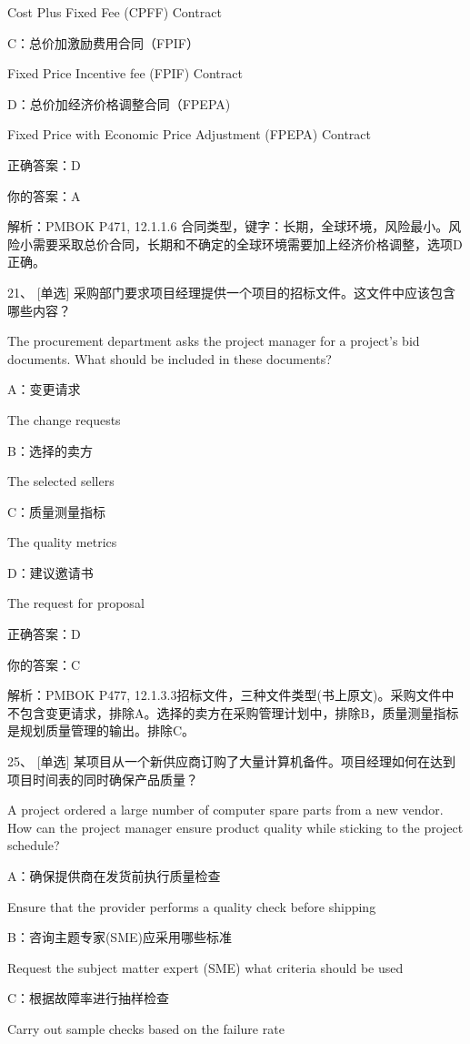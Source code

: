 Cost Plus Fixed Fee (CPFF) Contract

C：总价加激励费用合同（FPIF）

Fixed Price Incentive fee (FPIF) Contract

D：总价加经济价格调整合同（FPEPA)

Fixed Price with Economic Price Adjustment (FPEPA) Contract

正确答案：D

你的答案：A

解析：PMBOK P471, 12.1.1.6 合同类型，键字：长期，全球环境，风险最小。风险小需要采取总价合同，长期和不确定的全球环境需要加上经济价格调整，选项D正确。

21、 [单选] 采购部门要求项目经理提供一个项目的招标文件。这文件中应该包含哪些内容？

The procurement department asks the project manager for a project's bid documents. What should be included in these documents?

A：变更请求

The change requests

B：选择的卖方

The selected sellers

C：质量测量指标

The quality metrics

D：建议邀请书

The request for proposal

正确答案：D

你的答案：C

解析：PMBOK P477, 12.1.3.3招标文件，三种文件类型(书上原文)。采购文件中不包含变更请求，排除A。选择的卖方在采购管理计划中，排除B，质量测量指标是规划质量管理的输出。排除C。

25、 [单选] 某项目从一个新供应商订购了大量计算机备件。项目经理如何在达到项目时间表的同时确保产品质量？

A project ordered a large number of computer spare parts from a new vendor. How can the project manager ensure product quality while sticking to the project schedule?

A：确保提供商在发货前执行质量检查

Ensure that the provider performs a quality check before shipping

B：咨询主题专家(SME)应采用哪些标准

Request the subject matter expert (SME) what criteria should be used

C：根据故障率进行抽样检查

Carry out sample checks based on the failure rate

